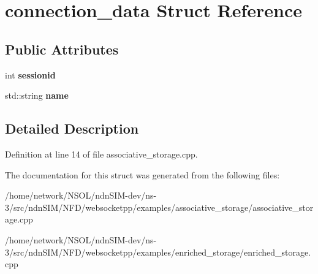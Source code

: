 \hypertarget{structconnection__data}{}\section{connection\+\_\+data Struct Reference}
\label{structconnection__data}
\subsection*{Public Attributes}
\begin{DoxyCompactItemize}
\item 
int {\bfseries sessionid}\hypertarget{structconnection__data_aaa7435f644ad456b84123dedd50a2faa}{}\label{structconnection__data_aaa7435f644ad456b84123dedd50a2faa}

\item 
std\+::string {\bfseries name}\hypertarget{structconnection__data_aef2f7b97910903dd40bfdf58adb3e9e9}{}\label{structconnection__data_aef2f7b97910903dd40bfdf58adb3e9e9}

\end{DoxyCompactItemize}


\subsection{Detailed Description}


Definition at line 14 of file associative\+\_\+storage.\+cpp.



The documentation for this struct was generated from the following files\+:\begin{DoxyCompactItemize}
\item 
/home/network/\+N\+S\+O\+L/ndn\+S\+I\+M-\/dev/ns-\/3/src/ndn\+S\+I\+M/\+N\+F\+D/websocketpp/examples/associative\+\_\+storage/associative\+\_\+storage.\+cpp\item 
/home/network/\+N\+S\+O\+L/ndn\+S\+I\+M-\/dev/ns-\/3/src/ndn\+S\+I\+M/\+N\+F\+D/websocketpp/examples/enriched\+\_\+storage/enriched\+\_\+storage.\+cpp\end{DoxyCompactItemize}

